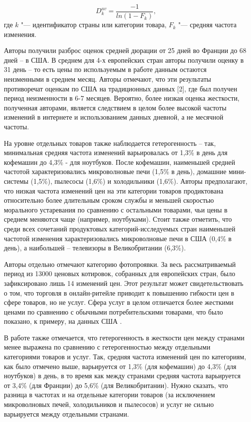 \begin{equation}
	\label{eq:equation1}
	D_k^{av}=\frac{-1}{ln⁡(1-F_k)},
\end{equation}
где \( k \) "--- идентификатор страны или категории товара, \( F_k \) "--- средняя частота изменения.

Авторы получили разброс оценок средней дюрации от 25 дней во Франции до 68 дней – в США. В среднем для 4-х европейских стран авторы получили оценку в 31 день – то есть цены по используемым в работе данным остаются неизменными в среднем месяц. Авторы отмечают, что эти результаты противоречат оценкам по США на традиционных данных [2], где был получен период неизменности в 6-7 месяцев. Вероятно, более низкая оценка жесткости, полученная авторами, является следствием в целом более высокой частоты изменений в интернете и использованием данных дневной, а не месячной частоты.

На уровне отдельных товаров также наблюдается гетерогенность – так, минимальная средняя частота изменений варьировалась от 1,3\% в день для кофемашин до 4,3\% - для ноутбуков. После кофемашин, наименьшей средней частотой характеризовались микроволновые печи (1,5\% в день), домашние мини-системы (1,5\%), пылесосы (1,6\%) и холодильники (1,6\%). Авторы предполагают, что низкая частота изменений цен на эти категории товаров продиктована относительно более длительным сроком службы и меньшей скоростью морального устаревания по сравнению с остальными товарами, чьи цены в среднем меняются чаще (например, ноутбуками). Стоит также отметить, что среди всех сочетаний продуктовых категорий-исследуемых стран наименьшей частотой изменения характеризовались микроволновые печи в США (0,4\% в день), а наибольшей – телевизоры в Великобритании (6,3\%).

Авторы отдельно отмечают категорию фотопроявки. За весь рассматриваемый период из 13000 ценовых котировок, собранных для европейских стран, было зафиксировано лишь 14 изменений цен. Этот результат может свидетельствовать о том, что торговля в онлайн-ритейле приводит к повышению гибкости цен в сфере товаров, но не услуг. Сфера услуг в целом отличается более жесткими ценами по сравнению с обычными потребительскими товарами, что было показано, к примеру, на данных США \cite{bils2004some}.

В работе также отмечается, что гетерогенность в жесткости цен между странами менее выражена по сравнению с гетерогенностью между отдельными категориями товаров и услуг. Так, средняя частота изменений цен по категориям, как было отмечено выше, варьируется от 1,3\% (для кофемашин) до 4,3\% (для ноутбуков) в день, в то время как между странами средняя частота варьируется от 3,4\% (для Франции) до 5,6\% (для Великобритании). Нужно сказать, что разница в частотах и на отдельные категории товаров (за исключением микроволновых печей, холодильников и пылесосов) и услуг не сильно варьируется между отдельными странами. 

